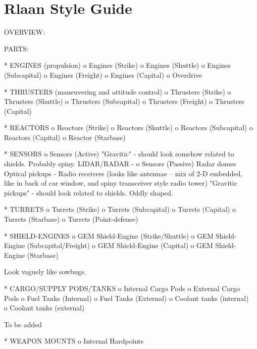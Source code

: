 \section{Rlaan Style Guide}
OVERVIEW:


PARTS:

    * ENGINES (propulsion)
          o Engines (Strike)
          o Engines (Shuttle)
          o Engines (Subcapital)
          o Engines (Freight)
          o Engines (Capital)
          o Overdrive




    * THRUSTERS (maneuvering and attitude control)
          o Thrusters (Strike)
          o Thrusters (Shuttle)
          o Thrusters (Subcapital)
          o Thrusters (Freight)
          o Thrusters (Capital)





    * REACTORS
          o Reactors (Strike)
          o Reactors (Shuttle)
          o Reactors (Subcapital)
          o Reactors (Capital)
          o Reactor (Starbase)




    * SENSORS
          o Sensors (Active)
            "Gravitic" - should look somehow related to shields. Probably spiny.
            LIDAR/RADAR - 
          o Sensors (Passive)
            Radar domes
            Optical pickups - 
            Radio receivers (looks like antennae -- mix of 2-D embedded, like in back of car window, and spiny transceiver style radio tower)
            "Gravitic pickups" - should look related to shields. Oddly shaped.


    * TURRETS
          o Turrets (Strike)
          o Turrets (Subcapital)
          o Turrets (Capital)
          o Turrets (Starbase)
          o Turrets (Point-defense)



    * SHIELD-ENGINES
          o GEM Shield-Engine (Strike/Shuttle)
          o GEM Shield-Engine (Subcapital/Freight)
          o GEM Shield-Engine (Capital)
          o GEM Shield-Engine (Starbase)


Look vaguely like sowbugs.

    * CARGO/SUPPLY PODS/TANKS
          o Internal Cargo Pods
          o External Cargo Pods
          o Fuel Tanks (Internal)
          o Fuel Tanks (External)
          o Coolant tanks (internal)
          o Coolant tanks (external)

To be added

    * WEAPON MOUNTS
          o Internal Hardpoints

